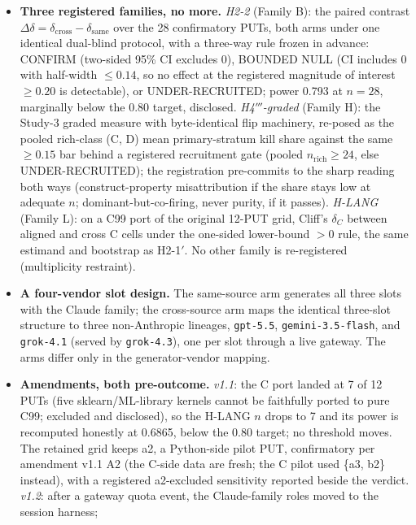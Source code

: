 \documentclass[manuscript,screen,review]{acmart}
\begin{document}
\begin{itemize}

\item
  \textbf{Three registered families, no more.} \emph{H2-2} (Family B): the
  paired contrast \(\Delta\delta = \delta_{\mathrm{cross}} -
  \delta_{\mathrm{same}}\) over the 28 confirmatory PUTs, both arms under one
  identical dual-blind protocol, with a three-way rule frozen in advance:
  CONFIRM (two-sided 95\% CI excludes 0), BOUNDED NULL (CI includes 0 with
  half-width \(\leq 0.14\), so no effect at the registered magnitude of
  interest \(\geq 0.20\) is detectable), or UNDER-RECRUITED; power 0.793 at
  \(n = 28\), marginally below the 0.80 target, disclosed.
  \emph{H4\('''\)-graded} (Family H): the Study-3 graded measure with
  byte-identical flip machinery, re-posed as the pooled rich-class (C, D)
  mean primary-stratum kill share against the same \(\geq 0.15\) bar behind a
  registered recruitment gate (pooled \(n_{\mathrm{rich}} \geq 24\), else
  UNDER-RECRUITED); the registration pre-commits to the sharp reading both
  ways (construct-property misattribution if the share stays low at adequate
  \(n\); dominant-but-co-firing, never purity, if it passes). \emph{H-LANG}
  (Family L): on a C99 port of the original 12-PUT grid, Cliff's \(\delta_C\)
  between aligned and cross C cells under the one-sided lower-bound \(> 0\)
  rule, the same estimand and bootstrap as H2-1\('\). No other family is
  re-registered (multiplicity restraint).
\item
  \textbf{A four-vendor slot design.} The same-source arm generates all three
  slots with the Claude family; the cross-source arm maps the identical
  three-slot structure to three non-Anthropic lineages, \texttt{gpt-5.5},
  \texttt{gemini-3.5-flash}, and \texttt{grok-4.1} (served by
  \texttt{grok-4.3}), one per slot through a live gateway. The arms differ
  only in the generator-vendor mapping.
\item
  \textbf{Amendments, both pre-outcome.} \emph{v1.1}: the C port landed at 7
  of 12 PUTs (five sklearn/ML-library kernels cannot be faithfully ported to
  pure C99; excluded and disclosed), so the H-LANG \(n\) drops to 7 and its
  power is recomputed honestly at 0.6865, below the 0.80 target; no threshold
  moves. The retained grid keeps a2, a Python-side pilot PUT, confirmatory
  per amendment v1.1 A2 (the C-side data are fresh; the C pilot used \{a3,
  b2\} instead), with a registered a2-excluded sensitivity reported beside
  the verdict. \emph{v1.2}: after a gateway
  quota event, the Claude-family roles moved to the session harness;

\end{itemize}
\end{document}
